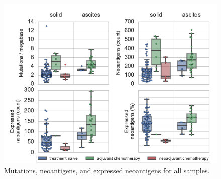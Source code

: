 \begin{table}[htbp]

\begin{figure}
\centering
\includegraphics[scale=1.0]{figures/counts.pdf}
\caption{Mutations, neoantigens, and expressed neoantigens for all samples.}
\label{fig:counts}
\end{figure}




\end{table}
